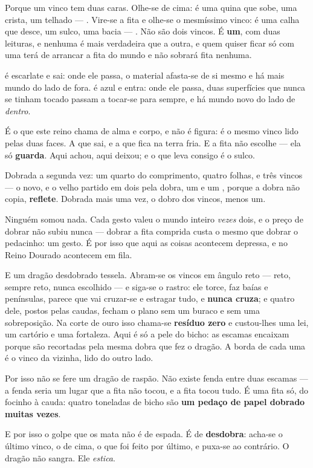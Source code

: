 \documentclass[livro.tex]{subfiles}
\begin{document}
Porque um vinco tem duas caras. Olhe-se de cima: é uma quina que sobe, uma crista, um telhado ---
\Mon . Vire-se a fita e olhe-se o mesmíssimo vinco: é uma calha que desce, um sulco, uma bacia
--- \Val . Não são dois vincos. É \textbf{um}, com duas leituras, e nenhuma é mais verdadeira que
a outra, e quem quiser ficar só com uma terá de arrancar a fita do mundo e não sobrará fita
nenhuma.

\Mon é escarlate e sai: onde ele passa, o material afasta-se de si mesmo e há mais mundo do lado
de fora. \Val é azul e entra: onde ele passa, duas superfícies que nunca se tinham tocado
passam a tocar-se para sempre, e há mundo novo do lado de \emph{dentro}.

É o que este reino chama de alma e corpo, e não é figura: é o mesmo vinco lido pelas duas faces.
A que sai, e a que fica na terra fria. E a fita não escolhe --- ela só \textbf{guarda}. Aqui
achou, aqui deixou; e o que leva consigo é o sulco.

\medskip

Dobrada a segunda vez: um quarto do comprimento, quatro folhas, e três vincos --- o novo, e o
velho partido em dois pela dobra, um \Mon e um \Val , porque a dobra não copia, \textbf{reflete}.
Dobrada mais uma vez, o dobro dos vincos, menos um.

Ninguém somou nada. Cada gesto valeu o mundo inteiro \emph{vezes} dois, e o preço de dobrar não
subiu nunca --- dobrar a fita comprida custa o mesmo que dobrar o pedacinho: um gesto. É por isso
que aqui as coisas acontecem depressa, e no Reino Dourado acontecem em fila.

E um dragão desdobrado tessela. Abram-se os vincos em ângulo reto --- reto, sempre reto, nunca
escolhido --- e siga-se o rastro: ele torce, faz baías e penínsulas, parece que vai cruzar-se e
estragar tudo, e \textbf{nunca cruza}; e quatro dele, postos pelas caudas, fecham o plano sem um
buraco e sem uma sobreposição. Na corte de ouro isso chama-se \textbf{resíduo zero} e
custou-lhes uma lei, um cartório e uma fortaleza. Aqui é só a pele do bicho: as escamas encaixam
porque são recortadas pela mesma dobra que fez o dragão. A borda de cada uma é o vinco da
vizinha, lido do outro lado.

Por isso não se fere um dragão de raspão. Não existe fenda entre duas escamas --- a fenda seria
um lugar que a fita não tocou, e a fita tocou tudo. É uma fita só, do focinho à cauda: quatro
toneladas de bicho são \textbf{um pedaço de papel dobrado muitas vezes}.

E por isso o golpe que os mata não é de espada. É de \textbf{desdobra}: acha-se o último vinco, o
de cima, o que foi feito por último, e puxa-se ao contrário. O dragão não sangra. Ele
\emph{estica}.
\end{document}
